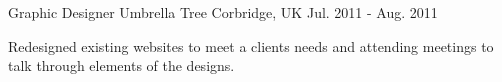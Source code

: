 \begin{cventries}
    \cventry
        {Graphic Designer}
        {Umbrella Tree}
        {Corbridge, UK}
        {Jul. 2011 - Aug. 2011}
        {
            \begin{cvitems}
                \item{Redesigned existing websites to meet a clients needs and attending meetings to talk through elements of the designs.}
            \end{cvitems}
        }
        \vspace{-0.2cm}

\end{cventries}